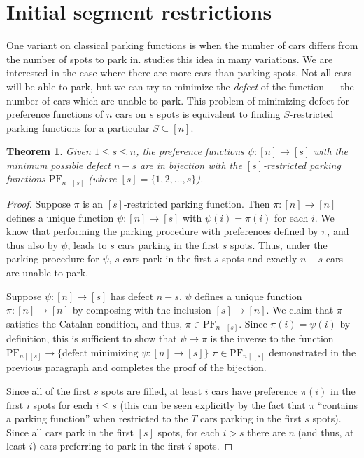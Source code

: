 \documentclass[12 pt]{amsart}
\newtheorem{theorem}{Theorem}
\theoremstyle{definition} %
\theoremstyle{remark} %
\begin{document}
\section{Initial segment restrictions}
 
One variant on classical parking functions is when the number of cars differs from the number of spots to park in. \cite{cameron-johannsen-prellberg-schweitzer-2008} studies this idea in many variations. We are interested in the case where there are more cars than parking spots. Not all cars will be able to park, but we can try to minimize the \textit{defect} of the function --- the number of cars which are unable to park. This problem of minimizing defect for preference functions of $n$ cars on $s$ spots is equivalent to finding $S$-restricted parking functions for a particular $S \subseteq [n]$.

\begin{theorem}
    Given $1\le s\le n$, the preference functions $\psi : [n] \to [s]$ with the minimum possible defect $n - s$ are in bijection with the $[s]$-restricted parking functions $\mathrm{PF}_{n \mid [s]}$ (where $[s] = \{ 1, 2, \dots, s \}$).
\end{theorem}

\begin{proof}
	Suppose $\pi$ is an $[s]$-restricted parking function. Then $\pi : [n] \to [n]$ defines a unique function $\psi : [n] \to [s]$ with $\psi(i) = \pi(i)$ for each $i$. We know that performing the parking procedure with preferences defined by $\pi$, and thus also by $\psi$, leads to $s$ cars parking in the first $s$ spots. Thus, under the parking procedure for $\psi$, $s$ cars park in the first $s$ spots and exactly $n - s$ cars are unable to park.

	Suppose $\psi : [n] \to [s]$ has defect $n - s$. $\psi$ defines a unique function $\pi : [n] \to [n]$ by composing with the inclusion $[s] \to [n]$. We claim that $\pi$ satisfies the Catalan condition, and thus, $\pi \in \mathrm{PF}_{n \mid [s]}$. Since $\pi(i) = \psi(i)$ by definition, this is sufficient to show that $\psi \mapsto \pi$ is the inverse to the function $\mathrm{PF}_{n \mid [s]} \to \{ \text{defect minimizing } \psi : [n] \to [s] \}$ $\pi \in \mathrm{PF}_{n \mid [s]}$ demonstrated in the previous paragraph and completes the proof of the bijection.

	Since all of the first $s$ spots are filled, at least $i$ cars have preference $\pi(i)$ in the first $i$ spots for each $i \le s$ (this can be seen explicitly by the fact that $\pi$ ``contains a parking function'' when restricted to the $T$ cars parking in the first $s$ spots). Since all cars park in the first $[s]$ spots, for each $i > s$ there are $n$ (and thus, at least $i$) cars preferring to park in the first $i$ spots.
\end{proof}
\end{document}
